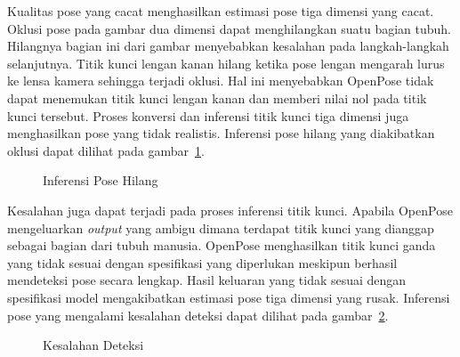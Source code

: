 
Kualitas pose yang cacat menghasilkan estimasi pose tiga dimensi yang cacat. Oklusi pose pada gambar
dua dimensi dapat menghilangkan suatu bagian tubuh. Hilangnya bagian ini dari gambar menyebabkan
kesalahan pada langkah-langkah selanjutnya. Titik kunci lengan kanan hilang ketika pose lengan
mengarah lurus ke lensa kamera sehingga terjadi oklusi. Hal ini menyebabkan OpenPose tidak dapat
menemukan titik kunci lengan kanan dan memberi nilai nol pada titik kunci tersebut. Proses konversi
dan inferensi titik kunci tiga dimensi juga menghasilkan pose yang tidak realistis. Inferensi pose
hilang yang diakibatkan oklusi dapat dilihat pada gambar~\ref{fig:bro76}.

\begin{figure}[htbp]
    \begin{center}
    \end{center}
    \vspace{-20pt}
    \captionsetup{labelfont=bf, textfont=bf}
    \caption{Inferensi Pose Hilang}
    \vspace{-10pt}
    \captionsetup{labelfont=md, textfont=md}
    \label{fig:bro76}
\end{figure}

\pagebreak

Kesalahan juga dapat terjadi pada proses inferensi titik kunci. Apabila OpenPose mengeluarkan
\textit{output} yang ambigu dimana terdapat titik kunci yang dianggap sebagai bagian dari tubuh manusia.
OpenPose menghasilkan titik kunci ganda yang tidak sesuai dengan spesifikasi yang diperlukan meskipun
berhasil mendeteksi pose secara lengkap.
Hasil keluaran yang tidak sesuai dengan spesifikasi model mengakibatkan estimasi pose tiga dimensi yang rusak.
Inferensi pose yang mengalami kesalahan deteksi dapat dilihat pada gambar~\ref{fig:bro131}.

\begin{figure}[htbp]
    \begin{center}
    \end{center}
    \vspace{-20pt}
    \captionsetup{labelfont=bf, textfont=bf}
    \caption{Kesalahan Deteksi}
    \vspace{-10pt}
    \captionsetup{labelfont=md, textfont=md}
    \label{fig:bro131}
\end{figure}